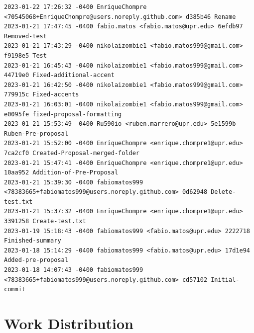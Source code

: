 \documentclass[12pt]{article}
\begin{document}
\begin{lstlisting}
2023-01-22 17:26:32 -0400 EnriqueChompre <70545068+EnriqueChompre@users.noreply.github.com> d385b46 Rename
2023-01-21 17:47:45 -0400 fabio.matos <fabio.matos@upr.edu> 6efdb97 Removed-test
2023-01-21 17:43:29 -0400 nikolaizombie1 <fabio.matos999@gmail.com> f9198e5 Test
2023-01-21 16:45:43 -0400 nikolaizombie1 <fabio.matos999@gmail.com> 44719e0 Fixed-additional-accent
2023-01-21 16:42:50 -0400 nikolaizombie1 <fabio.matos999@gmail.com> 779915c Fixed-accents
2023-01-21 16:03:01 -0400 nikolaizombie1 <fabio.matos999@gmail.com> e0095fe fixed-proposal-formatting
2023-01-21 15:53:49 -0400 Ru590io <ruben.marrero@upr.edu> 5e1599b Ruben-Pre-proposal
2023-01-21 15:52:00 -0400 EnriqueChompre <enrique.chompre1@upr.edu> 7ca2cf0 Created-Proposal-merged-folder
2023-01-21 15:47:41 -0400 EnriqueChompre <enrique.chompre1@upr.edu> 10aa952 Addition-of-Pre-Proposal
2023-01-21 15:39:30 -0400 fabiomatos999 <78383665+fabiomatos999@users.noreply.github.com> 0d62948 Delete-test.txt
2023-01-21 15:37:32 -0400 EnriqueChompre <enrique.chompre1@upr.edu> 3391258 Create-test.txt
2023-01-19 15:18:43 -0400 fabiomatos999 <fabio.matos@upr.edu> 2222718 Finished-summary
2023-01-18 15:14:29 -0400 fabiomatos999 <fabio.matos@upr.edu> 17d1e94 Added-pre-proposal
2023-01-18 14:07:43 -0400 fabiomatos999 <78383665+fabiomatos999@users.noreply.github.com> cd57102 Initial-commit
\end{lstlisting}
\section{Work Distribution}

\end{document}
